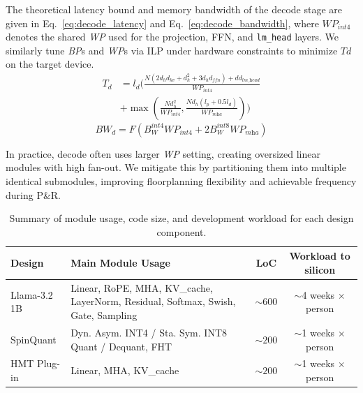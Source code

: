 \documentclass[conference]{IEEEtran}
\begin{document}
The theoretical latency bound and memory bandwidth of the decode stage are given in Eq.~\ref{eq:decode_latency} and Eq.~\ref{eq:decode_bandwidth}, where $\textit{WP}_{int4}$ denotes the shared \textit{WP} used for the projection, FFN, and \texttt{lm\_head} layers. We similarly tune \textit{BP}s and \textit{WP}s via ILP under hardware constraints to minimize $T{d}$ on the target device.
\begin{equation} \label{eq:decode_latency}
    \begin{split}
        T_{d} &= 
        l_{d}  
        (
        \frac{N(2 d_{h}d_{\textit{kv}} + d_{h}^2 + 3 d_{h}d_{\textit{ffn}}) + dd_{\textit{lm\_head}}}
        {\textit{WP}_{int4}} \\
        &+ \max(
        \frac{Nd_{h}^2}{\textit{WP}_{int4}},
        \frac{Nd_{h} (l_{p} + 0.5 l_{d})}
        {\textit{WP}_{\textit{mha}}}
        )
        )
    \end{split}
\end{equation}
\begin{equation}
BW_{d} = 
F(B_W^{\textit{int4}}\textit{WP}_{\textit{int4}} + 
2B_W^{\textit{int8}}\textit{WP}_{\textit{mha}})
\label{eq:decode_bandwidth}
\end{equation}


In practice, decode often uses larger \textit{WP} setting, creating oversized linear modules with high fan-out. We mitigate this by partitioning them into multiple identical submodules, improving floorplanning flexibility and achievable frequency during P\&R.

\begin{table}[t]
\centering
\scriptsize
\caption{Summary of module usage, code size, and development workload for each design component.}
\vspace{-0.2cm}
\renewcommand{\arraystretch}{1.1}
\setlength{\tabcolsep}{2.5pt}
\begin{tabular}{l|p{3.5cm}|c|c}
\hline
\textbf{Design} & \textbf{Main Module Usage} & \textbf{LoC} & \textbf{Workload to silicon} \\
\hline
Llama-3.2 1B & Linear, RoPE, MHA, KV\_cache, LayerNorm, Residual, Softmax, Swish, Gate, Sampling & $\sim600$ & $\sim$4 weeks $\times$ person \\
SpinQuant & Dyn. Asym. INT4 / Sta. Sym. INT8 Quant / Dequant, FHT & $\sim200$ & $\sim$1 weeks $\times$ person \\
HMT Plug-in & Linear, MHA, KV\_cache & $\sim200$ & $\sim$1 weeks $\times$ person \\
\hline
\end{tabular}
\label{tab:module_summary}
\vspace{-0.2cm}
\end{table}
\end{document}

